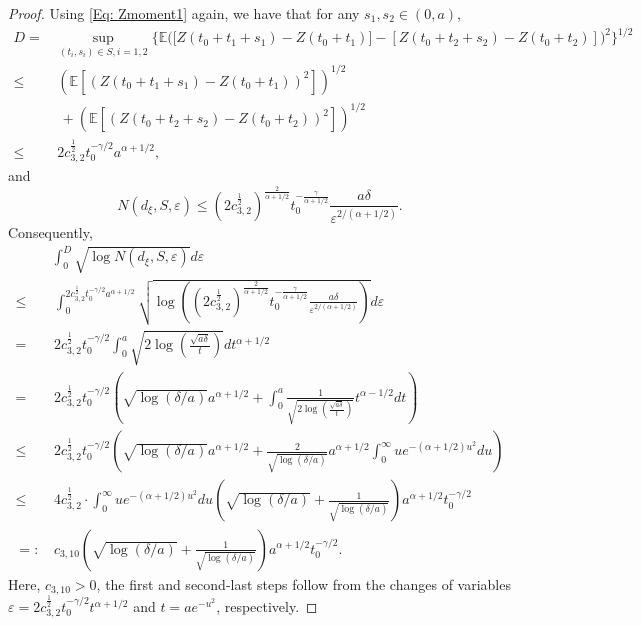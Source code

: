 \documentclass[11pt, reqno]{amsart}
\numberwithin{equation}{section}
\newcommand{\1}{{\bf 1}}
\newcommand{\2}{{\bf 2}}
\begin{document}
\begin{proof}
 Using \eqref{Eq: Zmoment1} again,    we have    {that for  any $s_1, s_2\in (0,a)$},
  \begin{equation}\label{eq D2}
   \begin{split}
   D=&\sup_{(t_i, s_i)\in S, i=1,2} \Bigg\{\mathbb E\Big( \big[Z(t_0+t_1+s_1)-Z(t_0+t_1)\big] 
     -\left[Z(t_0+t_2+s_2)-Z(t_0+t_2) \right] \Big)^2 \Bigg \}^{1/2}\\
   \le &\,       \left(\mathbb E\left[\left(Z(t_0+t_1+s_1)-Z(t_0+t_1)\right)^2 \right]\right)^{1/2} \\
&\,\,    + \left(\mathbb E\left[\left(Z(t_0+t_2+s_2)- {Z}(t_0+t_2)\right)^2 \right]\right)^{1/2}\\
   \le &\,   {2c_{3,2}^{\frac12}}t_0^{-\gamma/2} a^{\alpha+1/2},
   \end{split}
   \end{equation}
    and
   \begin{equation*}
   N(d_{\xi}, S,\varepsilon)\le \left( {2c_{3,2}^{\frac12}}\right)^{\frac{2}{\alpha+1/2}} t_0^{-\frac{\gamma}{ \alpha+1/2}}   \frac{a\delta}{\varepsilon^{2/(\alpha+1/2)}}.
   \end{equation*}
  Consequently,   
   \begin{equation}\label{eq int}
   \begin{split}
   &\int_0^D\sqrt{\log  N(d_{\xi}, S,\varepsilon)  } d\varepsilon\\
   \le&\,  \int_0^{ {2c_{3,2}^{\frac12}} t_0^{-\gamma/2}a^{\alpha+1/2}}\sqrt{ \log  \left( \left(  {2c_{3,2}^{\frac12}}\right)^{\frac{2}{\alpha+1/2}} t_0^{-\frac{\gamma}{ \alpha+1/2}}
   \frac{a\delta}{\varepsilon^{2/(\alpha+1/2)}}\right)  } d\varepsilon\\
   = &\,  {2c_{3,2}^{\frac12}} t_0^{-\gamma/2}\int_0^{ a }\sqrt{2 \log \left(   \frac{\sqrt{a\delta}}{ t }\right)  }  d t^{\alpha+1/2}\\
  =&\,  { 2c_{3,2}^{\frac12}} t_0^{-\gamma/2}\left(\sqrt{\log( \delta/a)} a^{\alpha+1/2}+ \int_0^{a} \frac{1}{\sqrt{2 \log \left(    \frac{\sqrt{a\delta}}{ t }\right)  }} t^{\alpha-1/2}dt \right)\\
    \le &\,  {2c_{3,2}^{\frac12} }t_0^{-\gamma/2}  \left(\sqrt{\log(\delta/a)}a^{\alpha+1/2}+   \frac{2}{\sqrt{\log( \delta/a )}} a^{\alpha+1/2}\int_0^{\infty} ue^{-(\alpha+1/2)u^2}du \right)\\
    \le&\,   {4c_{3,2}^{\frac12}  }
\cdot \int_0^{\infty} ue^{-(\alpha+1/2)u^2}du         \left(\sqrt{\log(\delta/a)}  + \frac{1}{\sqrt{\log(\delta/a)}}  \right)  a^{\alpha+1/2} t_0^{-\gamma/2} \\
=: &\,  c_{3,10}   \left(\sqrt{\log(\delta/a)}  + \frac{1}{\sqrt{\log(\delta/a)}}  \right)   a^{\alpha+1/2} t_0^{-\gamma/2}.
   \end{split}
   \end{equation}
 {Here,  $c_{3,10}>0$,   the first and second-last steps follow from the changes of variables   $\varepsilon= 2c_{3,2}^{\frac12} t_0^{-\gamma/2}t^{\alpha+1/2}$ 
and    $t=a e^{-u^2}$,  respectively.}
 

\end{proof}
\end{document}
